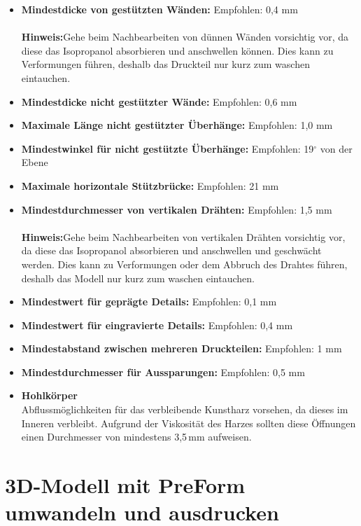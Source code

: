 \documentclass{\basedir/fablab-document}
\begin{document}
	\begin{itemize}
	\item \textbf{Mindestdicke von gestützten Wänden:}  Empfohlen: 0,4 mm\\
	\\
	\textbf{Hinweis:}Gehe beim Nachbearbeiten von dünnen Wänden vorsichtig vor, da diese das Isopropanol absorbieren und anschwellen können. Dies kann zu Verformungen führen, deshalb das Druckteil nur kurz zum waschen eintauchen. \\
	\item \textbf{Mindestdicke nicht gestützter Wände:}  Empfohlen: 0,6 mm
	\item \textbf{Maximale Länge nicht gestützter Überhänge:}  Empfohlen: 1,0 mm
	\item \textbf{Mindestwinkel für nicht gestützte Überhänge:}  Empfohlen: 19$^\circ$ von der Ebene
	\item \textbf{Maximale horizontale Stützbrücke:}  Empfohlen: 21 mm
	\item \textbf{Mindestdurchmesser von vertikalen Drähten:}  Empfohlen: 1,5 mm \\
	\\
	\textbf{Hinweis:}Gehe beim Nachbearbeiten von vertikalen Drähten vorsichtig vor, da diese das Isopropanol absorbieren und anschwellen und geschwächt werden. Dies kann zu Verformungen oder dem Abbruch des Drahtes führen, deshalb das Modell nur kurz zum waschen eintauchen. \\
	\item \textbf{Mindestwert für geprägte Details:}  Empfohlen: 0,1 mm
	\item \textbf{Mindestwert für eingravierte Details:}  Empfohlen: 0,4 mm
	\item \textbf{Mindestabstand zwischen mehreren Druckteilen:}  Empfohlen: 1 mm
	\item \textbf{Mindestdurchmesser für Aussparungen:}  Empfohlen: 0,5 mm
	\item \textbf{Hohlkörper} \\
	Abflussmöglichkeiten für das verbleibende Kunstharz vorsehen, da dieses im Inneren verbleibt. Aufgrund der Viskosität des Harzes sollten diese Öffnungen einen Durchmesser von mindestens 3,5\,mm aufweisen.
	
\end{itemize}


	\newpage
	


\section{3D-Modell mit PreForm umwandeln und ausdrucken}
 
\end{document}
